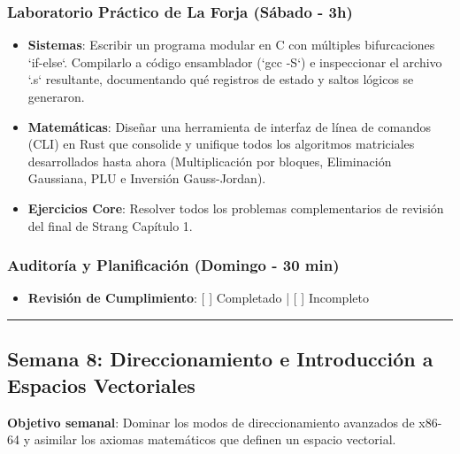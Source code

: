 \documentclass[11pt, a4paper]{article}
\begin{document}
\subsubsection{Laboratorio Práctico de La Forja (Sábado - 3h)}
\begin{itemize}
    \item \textbf{Sistemas}: Escribir un programa modular en C con múltiples bifurcaciones `if-else`. Compilarlo a código ensamblador (`gcc -S`) e inspeccionar el archivo `.s` resultante, documentando qué registros de estado y saltos lógicos se generaron.
    \item \textbf{Matemáticas}: Diseñar una herramienta de interfaz de línea de comandos (CLI) en Rust que consolide y unifique todos los algoritmos matriciales desarrollados hasta ahora (Multiplicación por bloques, Eliminación Gaussiana, PLU e Inversión Gauss-Jordan).
    \item \textbf{Ejercicios Core}: Resolver todos los problemas complementarios de revisión del final de Strang Capítulo 1.
\end{itemize}

\subsubsection{Auditoría y Planificación (Domingo - 30 min)}
\begin{itemize}
    \item \textbf{Revisión de Cumplimiento}: [ ] Completado | [ ] Incompleto
\end{itemize}

\noindent\rule{\textwidth}{0.4pt}

\subsection{Semana 8: Direccionamiento e Introducción a Espacios Vectoriales}
\textbf{Objetivo semanal}: Dominar los modos de direccionamiento avanzados de x86-64 y asimilar los axiomas matemáticos que definen un espacio vectorial.
\end{document}
